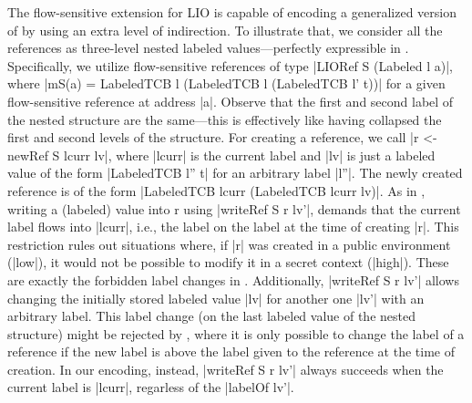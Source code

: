 The flow-sensitive extension for LIO is capable of encoding a generalized version
of {\nsu} by using an extra level of indirection.  To illustrate that, we
consider all the references as three-level nested labeled values---perfectly
expressible in \liofs{}. Specifically, we utilize flow-sensitive references of
type |LIORef S (Labeled l a)|, where |mS(a) = LabeledTCB l (LabeledTCB l
(LabeledTCB l' t))| for a given flow-sensitive reference at address |a|. Observe
that the first and second label of the nested structure are the same---this is
effectively like having collapsed the first and second levels of the structure. For
creating a reference, we call |r <- newRef S lcurr lv|, where |lcurr| is the
current label and |lv| is just a labeled value of the form |LabeledTCB l'' t|
for an arbitrary label |l''|.  The newly created reference is of the form
|LabeledTCB lcurr (LabeledTCB lcurr lv)|.  As in {\nsu}, writing a (labeled)
value into r using |writeRef S r lv'|, demands that the current label flows into
|lcurr|, i.e., the label on the label at the time of creating |r|. This
restriction rules out situations where, if |r| was created in a public
environment (|low|), it would not be possible to modify it in a secret context
(|high|). These are exactly the forbidden label changes in {\nsu}. Additionally,
|writeRef S r lv'| allows changing the initially stored labeled value |lv| for
another one |lv'| with an arbitrary label. This label change (on the last
labeled value of the nested structure) might be rejected by {\nsu}, where it is
only possible to change the label of a reference if the new label is 
above the label given to the reference at the time of creation. In our encoding,
instead, |writeRef S r lv'| always succeeds when the current label is
|lcurr|, regarless of the |labelOf lv'|. 


